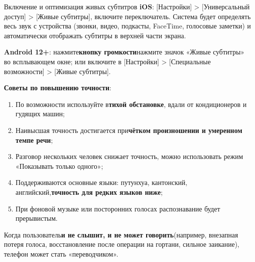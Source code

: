 \begin{tcbinfo}{Включение и оптимизация живых субтитров}
\textbf{iOS}: [Настройки] > [Универсальный доступ] > [Живые субтитры], включите переключатель. Система будет определять весь звук с устройства (звонки, видео, подкасты, FaceTime, голосовые заметки) и автоматически отображать субтитры в верхней части экрана.

\textbf{Android 12+}: нажмите\textbf{кнопку громкости}нажмите значок «Живые субтитры» во всплывающем окне; или включите в [Настройки] > [Специальные возможности] > [Живые субтитры].

\textbf{Советы по повышению точности}:

\begin{enumerate}
  \item По возможности используйте в\textbf{тихой обстановке}, вдали от кондиционеров и гудящих машин;
  \item Наивысшая точность достигается при\textbf{чётком произношении и умеренном темпе речи};
  \item Разговор нескольких человек снижает точность, можно использовать режим «Показывать только одного»;
  \item Поддерживаются основные языки: путунхуа, кантонский, английский,\textbf{точность для редких языков ниже};
  \item При фоновой музыке или посторонних голосах распознавание будет прерывистым.
\end{enumerate}

\end{tcbinfo}


Когда пользователь\textbf{и не слышит, и не может говорить}(например, внезапная потеря голоса, восстановление после операции на гортани, сильное заикание), телефон может стать «переводчиком».

